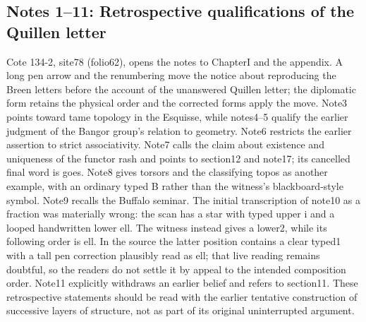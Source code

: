 \subsection*{Notes 1--11: Retrospective qualifications of the Quillen letter}
Cote 134-2, site78 (folio62), opens the notes to ChapterI and the appendix. A long pen arrow and the renumbering move the notice about reproducing the Breen letters before the account of the unanswered Quillen letter; the diplomatic form retains the physical order and the corrected forms apply the move. Note3 points toward tame topology in the Esquisse, while notes4--5 qualify the earlier judgment of the Bangor group's relation to geometry. Note6 restricts the earlier assertion to strict associativity. Note7 calls the claim about existence and uniqueness of the functor rash and points to section12 and note17; its cancelled final word is goes. Note8 gives torsors and the classifying topos as another example, with an ordinary typed B rather than the witness's blackboard-style symbol. Note9 recalls the Buffalo seminar. The initial transcription of note10 as a fraction was materially wrong: the scan has a star with typed upper i and a looped handwritten lower ell. The witness instead gives a lower2, while its following order is ell. In the source the latter position contains a clear typed1 with a tall pen correction plausibly read as ell; that live reading remains doubtful, so the readers do not settle it by appeal to the intended composition order. Note11 explicitly withdraws an earlier belief and refers to section11. These retrospective statements should be read with the earlier tentative construction of successive layers of structure, not as part of its original uninterrupted argument.

